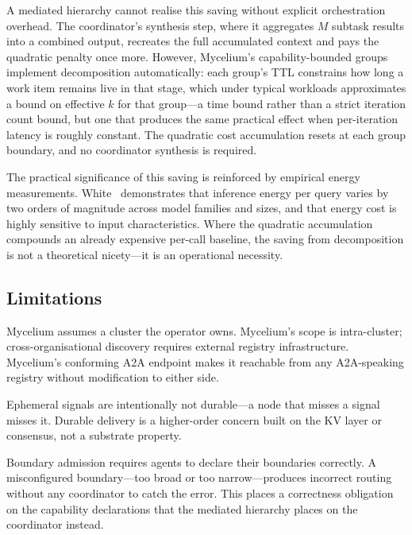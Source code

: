 \documentclass[11pt]{article}
\begin{document}
A mediated hierarchy cannot realise this saving without explicit orchestration
overhead. The coordinator's synthesis step, where it aggregates $M$ subtask
results into a combined output, recreates the full accumulated context and pays
the quadratic penalty once more. However, Mycelium's capability-bounded groups
implement decomposition automatically: each group's TTL constrains how long a work
item remains live in that stage, which under typical workloads approximates a bound
on effective $k$ for that group---a time bound rather than a strict iteration count
bound, but one that produces the same practical effect when per-iteration latency
is roughly constant. The quadratic cost accumulation resets at each group boundary,
and no coordinator synthesis is required.

The practical significance of this saving is reinforced by empirical energy
measurements. White~\cite{white2025} demonstrates that inference energy per
query varies by two orders of magnitude across model families and sizes, and
that energy cost is highly sensitive to input characteristics. Where the
quadratic accumulation compounds an already expensive per-call baseline, the
saving from decomposition is not a theoretical nicety---it is an operational
necessity.

\subsection{Limitations}

Mycelium assumes a cluster the operator owns. Mycelium's scope is intra-cluster;
cross-organisational discovery requires external registry infrastructure.
Mycelium's conforming A2A endpoint makes it reachable from any A2A-speaking
registry without modification to either side.

Ephemeral signals are intentionally not durable---a node that misses a signal
misses it. Durable delivery is a higher-order concern built on the KV layer or
consensus, not a substrate property.

Boundary admission requires agents to declare their boundaries correctly. A
misconfigured boundary---too broad or too narrow---produces incorrect routing
without any coordinator to catch the error. This places a correctness obligation
on the capability declarations that the mediated hierarchy places on the
coordinator instead.
\end{document}
